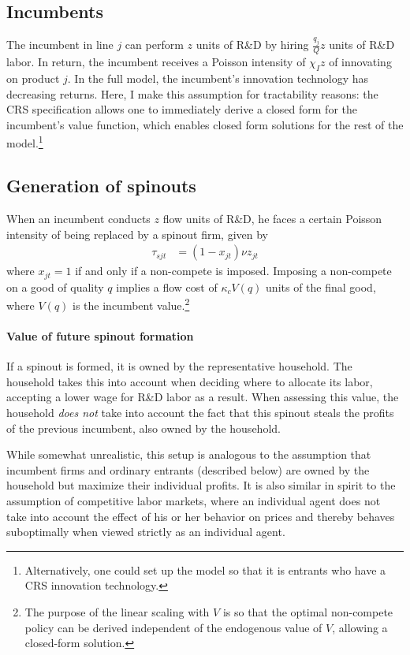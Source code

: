 \documentclass[12pt,english]{article}
\theoremstyle{remark}
\begin{document}
\subsection{Incumbents}

The incumbent in line $j$ can perform $z$ units of R\&D by hiring $\frac{q_j}{Q}z$ units of R\&D labor. In return, the incumbent receives a Poisson intensity of $\chi_I z$ of innovating on product $j$. In the full model, the incumbent's innovation technology has decreasing returns. Here, I make this assumption for tractability reasons: the CRS specification allows one to immediately derive a closed form for the incumbent's value function, which enables closed form solutions for the rest of the model.\footnote{Alternatively, one could set up the model so that it is entrants who have a CRS innovation technology.}

\subsection{Generation of spinouts}

When an incumbent conducts $z$ flow units of R\&D, he faces a certain Poisson intensity of being replaced by a spinout firm, given by 
\begin{align*}
	\tau_{sjt} &= (1-x_{jt}) \nu z_{jt}
\end{align*} 
where $x_{jt} = 1$ if and only if a non-compete is imposed. Imposing a non-compete on a good of quality $q$ implies a flow cost of $\kappa_{c} V(q)$ units of the final good, where $V(q)$ is the incumbent value.\footnote{The purpose of the linear scaling with $V$ is so that the optimal non-compete policy can be derived independent of the endogenous value of $V$, allowing a closed-form solution.}

\paragraph{Value of future spinout formation}

If a spinout is formed, it is owned by the representative household. The household takes this into account when deciding where to allocate its labor, accepting a lower wage for R\&D labor as a result. When assessing this value, the household \textit{does not} take into account the fact that this spinout steals the profits of the previous incumbent, also owned by the household. 

While somewhat unrealistic, this setup is analogous to the assumption that incumbent firms and ordinary entrants (described below) are owned by the household but maximize their individual profits. It is also similar in spirit to the assumption of competitive labor markets, where an individual agent does not take into account the effect of his or her behavior on prices and thereby behaves suboptimally when viewed strictly as an individual agent.
\end{document}
